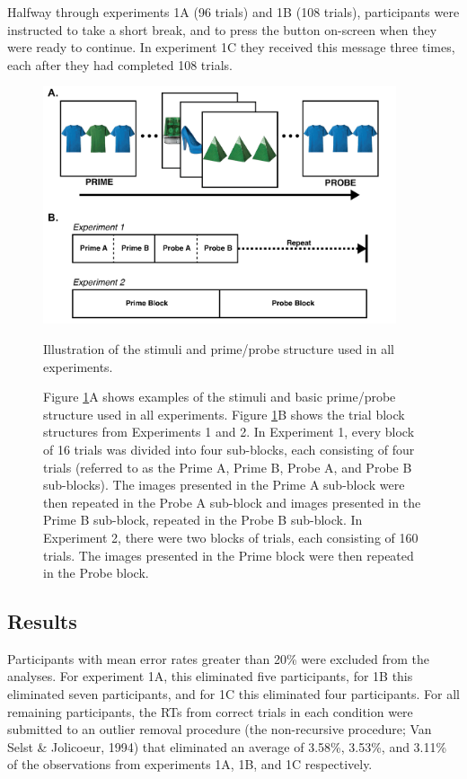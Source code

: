 \documentclass[]{DissertateCUNY}
\begin{document}
Halfway through experiments 1A (96 trials) and 1B (108 trials),
participants were instructed to take a short break, and to press the
button on-screen when they were ready to continue. In experiment 1C they
received this message three times, each after they had completed 108
trials.

\begin{figure}
  \centering
  \includegraphics[height=2.75in]{figures/MGfigure1.png}
  \caption{Illustration of the stimuli and prime/probe structure used in all experiments.}
  \caption*{Figure \ref{MG_figure1}A shows examples of the stimuli and basic prime/probe structure used in all experiments. Figure \ref{MG_figure1}B shows the trial block structures from Experiments 1 and 2. In Experiment 1, every block of 16 trials was divided into four sub-blocks, each consisting of four trials (referred to as the Prime A, Prime B, Probe A, and Probe B sub-blocks). The images presented in the Prime A sub-block were then repeated in the Probe A sub-block and images presented in the Prime B sub-block, repeated in the Probe B sub-block. In Experiment 2, there were two blocks of trials, each consisting of 160 trials. The images presented in the Prime block were then repeated in the Probe block.}

  \label{MG_figure1}
\end{figure}

\hypertarget{results-4}{%
\subsection{Results}\label{results-4}}

Participants with mean error rates greater than 20\% were excluded from
the analyses. For experiment 1A, this eliminated five participants, for
1B this eliminated seven participants, and for 1C this eliminated four
participants. For all remaining participants, the RTs from correct
trials in each condition were submitted to an outlier removal procedure
(the non-recursive procedure; Van Selst \& Jolicoeur, 1994) that
eliminated an average of 3.58\%, 3.53\%, and 3.11\% of the observations
from experiments 1A, 1B, and 1C respectively.
\end{document}
